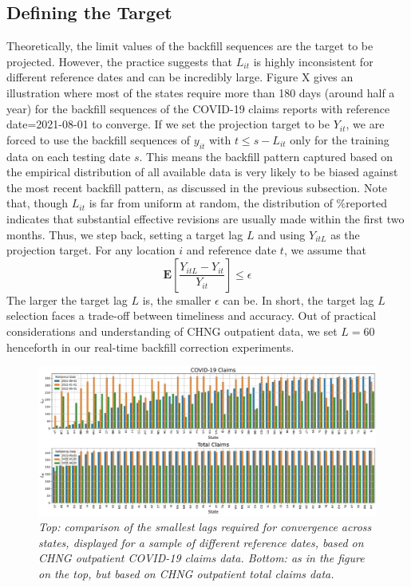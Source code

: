 \subsection{Defining the Target}
Theoretically, the limit values of the backfill sequences are the target to be projected. However, the practice suggests that $L_{it}$ is highly inconsistent for different reference dates and can be incredibly large. Figure X gives an illustration where most of the states require more than 180 days (around half a year) for the backfill sequences of the COVID-19 claims reports with reference date=2021-08-01 to converge. If we set the projection target to be $Y_{it}$, we are forced to use the backfill sequences of $y_{it}$ with $t \leq s-L_{it}$ only for the training data on each testing date $s$. This means the backfill pattern captured based on the empirical distribution of all available data is very likely to be biased against the most recent backfill pattern, as discussed in the previous subsection. Note that, though $L_{it}$ is far from uniform at random, the distribution of \%reported indicates that substantial effective revisions are usually made within the first two months. Thus, we step back, setting a target lag $L$ and using $Y_{itL}$ as the projection target. For any location $i$ and reference date $t$, we assume that $$\mathbf{E}[\frac{Y_{itL} - Y_{it}}{Y_{it}}] \leq \epsilon $$ The larger the target lag $L$ is, the smaller $\epsilon$ can be. In short, the target lag $L$ selection faces a trade-off between timeliness and accuracy. Out of practical considerations and understanding of CHNG outpatient data, we set $L=60$ henceforth in our real-time backfill correction experiments.

\begin{figure}
    \centering
    \includegraphics[width=\textwidth]{figs/Lit_examples.pdf}
    \caption{\textit{Top: comparison of the smallest lags required for convergence across states, displayed for a sample of different reference dates, based on CHNG outpatient COVID-19 claims data. Bottom: as in the figure on the top, but based on CHNG outpatient total claims data.}}
\end{figure}

